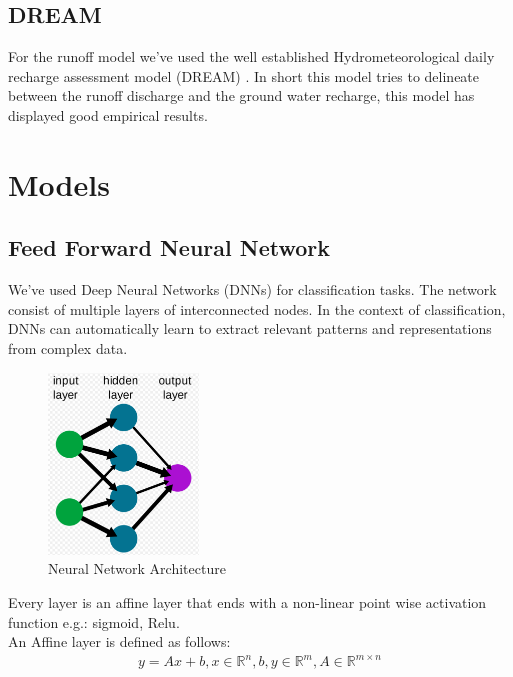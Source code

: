 \documentclass[12pt]{report}
\begin{document}
\subsection{DREAM}

For the runoff model we've used the well established Hydrometeorological daily recharge assessment model (DREAM) \cite{DREAM}. In short this model tries to delineate between the runoff discharge and the ground water recharge, this model has displayed good empirical results.
\newpage
\section{Models}
\subsection{Feed Forward Neural Network}

We've used Deep Neural Networks (DNNs) for classification tasks. The network consist of multiple layers of interconnected nodes. In the context of classification, DNNs can automatically learn to extract relevant patterns and representations from complex data.\\   
\begin{figure}[H]\centering\includegraphics[width=4cm]{FFNN.png}\caption{Neural Network Architecture}\end{figure}

Every layer is an affine layer that ends with a non-linear point wise activation function e.g.: sigmoid, Relu.\\

An Affine layer is defined as follows: 
\begin{align*}
	y = Ax + b , x \in \mathbb{R}^n, b, y \in \mathbb{R}^m, A \in \mathbb{R}^{m \times n}
\end{align*}
\end{document}
